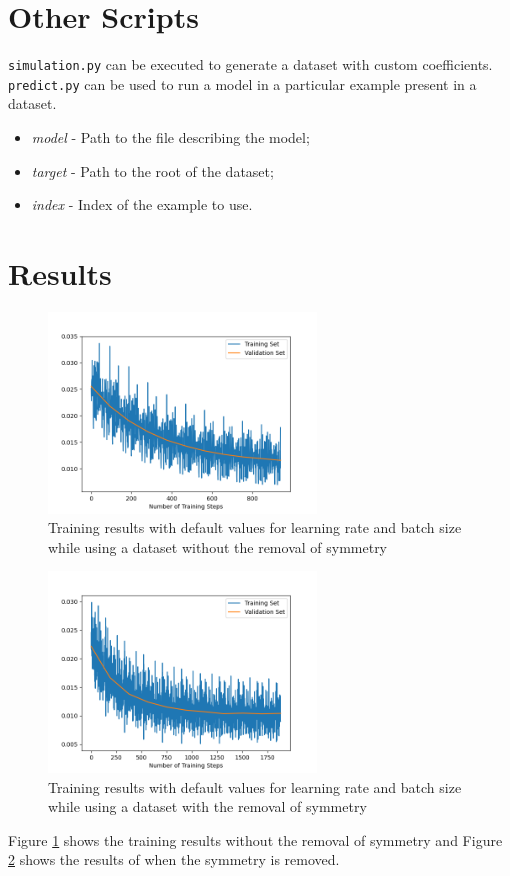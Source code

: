 \documentclass[conference]{IEEEtran}
\begin{document}
\section{Other Scripts}

\verb|simulation.py| can be executed to generate a dataset with 
custom coefficients. \verb|predict.py| can be used to run a model 
in a particular example present in a dataset.

\begin{itemize}
    \item \textit{model} - Path to the file describing the model;
    \item \textit{target} - Path to the root of the dataset;
    \item \textit{index} - Index of the example to use.
\end{itemize}

\section{Results}

\begin{figure}[!t]
\centering
\includegraphics[width=2.8in]{images/results_set_1_100.png}
\caption{Training results with default values for learning rate and batch
size while using a dataset without the removal of symmetry}
\label{fig:symm}
\end{figure}

\begin{figure}[!t]
\centering
\includegraphics[width=2.8in]{images/results_no_symm_100.png}
\caption{Training results with default values for learning rate and batch
size while using a dataset with the removal of symmetry}
\label{fig:no-symm}
\end{figure}

Figure \ref{fig:symm} shows the training results without the removal
of symmetry and Figure \ref{fig:no-symm} shows the results of when
the symmetry is removed.
\end{document}
